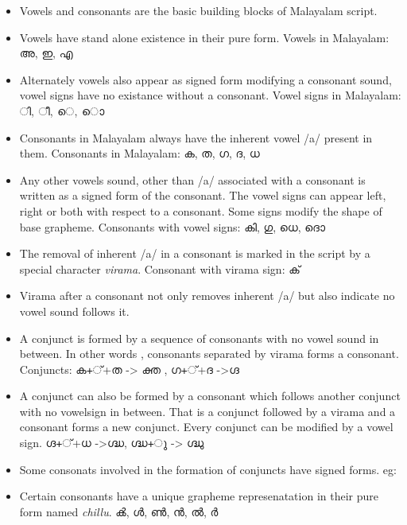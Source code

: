 \documentclass[10pt]{article}
\begin{document}
\begin{itemize}
	\item
	Vowels and consonants are the basic building blocks of Malayalam script. 
	\item
	Vowels have stand alone existence in their pure form. Vowels in Malayalam: {\manjari അ, ഇ, എ }
	\item
	Alternately vowels also appear as signed form modifying a consonant sound, vowel signs have no existance without a consonant. Vowel signs in Malayalam: {\manjari  ി, ീ, െ, ൊ}
	\item Consonants in Malayalam always have the inherent vowel /a/ present in them. Consonants in Malayalam: {\manjari ക, ത, ഗ, ദ, ധ }
	\item
	Any other vowels sound, other than /a/  associated with a consonant is written as a signed form of the consonant. The vowel signs can  appear left, right or both with respect to a consonant. Some signs modify the shape of base grapheme. Consonants with vowel signs:  {\manjari കി, ഗു, ധെ, ദൊ} 
	
	\item
	The removal of inherent /a/ in a consonant is marked in the script by a special character \textit{virama}. Consonant with virama sign: {\manjari ക് }
	\item
	Virama after a consonant not only removes inherent /a/ but also indicate no vowel sound follows it. 
	\item
	A conjunct is formed by  a sequence of consonants with no vowel sound in between. In other words , consonants separated by virama forms a consonant. Conjuncts: {\manjari ക+്+ത -> ക്ത , ഗ+്+ദ ->ഗ്ദ }
	\item
	A conjunct can also be formed by a consonant which follows another conjunct with no vowelsign in between. That is a conjunct followed by a virama and a consonant forms a new conjunct. Every conjunct can be modified by a vowel sign. {\manjari ഗ്ദ+്+ധ ->ഗ്ദ്ധ, ഗ്ദ്ധ+ു -> ഗ്ദ്ധു }
	
	\item
	Some consonats involved in the formation of conjuncts have signed forms. eg:{}
	
	\item 
	Certain consonants have a unique grapheme represenatation in their pure form named \textit{chillu}. {\manjari ൿ, ൾ, ൺ, ൻ, ൽ, ർ }
\end{itemize}
\end{document}

